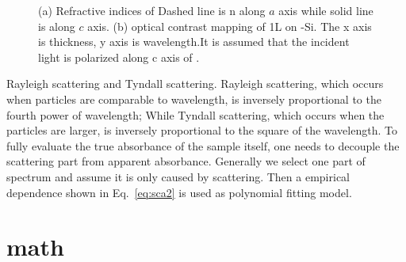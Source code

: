 \documentclass[12pt,oneside]{book}
\begin{document}
\begin{figure}[htb]
\centering
{}%
\caption[Refractive indices of ]{(a) Refractive indices of  Dashed line is n along $a$ axis while solid line is along $c$ axis. (b) optical contrast mapping of 1L  on -Si. The x axis is  thickness, y axis is wavelength.It is assumed that the incident light is polarized along c axis of .}
\label{fig:mofl}
\end{figure}

Rayleigh scattering and Tyndall scattering. Rayleigh scattering, which occurs when particles are comparable to wavelength, is inversely proportional to the fourth power of wavelength; While Tyndall scattering, which occurs when the particles are larger, is inversely proportional to the square of the wavelength. To fully evaluate the true absorbance of the sample itself, one needs to decouple the scattering part from apparent absorbance. Generally we select one part of spectrum and assume it is only caused by scattering. Then a empirical dependence shown in Eq.~\ref{eq:sca2} is used as polynomial fitting model.

    \appendix
    \chapter{math}
    \renewcommand{\bibname}{REFERENCES}
    \begin{singlespace}
    \printbibliography
    \end{singlespace}
\end{document}
